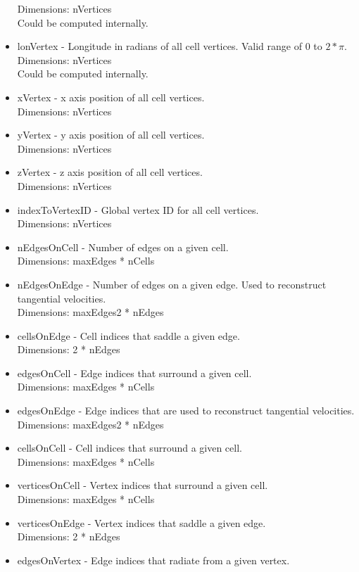 \documentclass[11pt]{report}
\begin{document}
\begin{itemize}
		  Dimensions: nVertices \\
		  Could be computed internally. 
	\item lonVertex - Longitude in radians of all cell vertices. Valid range of $0$ to $2*\pi$. \\
		  Dimensions: nVertices \\
		  Could be computed internally. 
	\item xVertex - x axis position of all cell vertices. \\
		  Dimensions: nVertices
	\item yVertex - y axis position of all cell vertices. \\
		  Dimensions: nVertices
	\item zVertex - z axis position of all cell vertices. \\
		  Dimensions: nVertices
	\item indexToVertexID - Global vertex ID for all cell vertices. \\
		  Dimensions: nVertices
	\item nEdgesOnCell - Number of edges on a given cell. \\
		  Dimensions: maxEdges * nCells
	\item nEdgesOnEdge - Number of edges on a given edge. Used to reconstruct tangential velocities. \\
		  Dimensions: maxEdges2 * nEdges
	\item cellsOnEdge - Cell indices that saddle a given edge. \\
		  Dimensions: 2 * nEdges
	\item edgesOnCell - Edge indices that surround a given cell. \\
		  Dimensions: maxEdges * nCells
	\item edgesOnEdge - Edge indices that are used to reconstruct tangential velocities. \\
		  Dimensions: maxEdges2 * nEdges
	\item cellsOnCell - Cell indices that surround a given cell. \\
		  Dimensions: maxEdges * nCells
	\item verticesOnCell - Vertex indices that surround a given cell. \\
		  Dimensions: maxEdges * nCells
	\item verticesOnEdge - Vertex indices that saddle a given edge. \\
		  Dimensions: 2 * nEdges
	\item edgesOnVertex - Edge indices that radiate from a given vertex. \\

\end{itemize}
\end{document}
